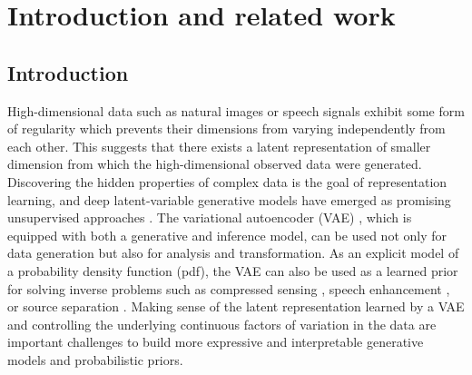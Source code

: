 \documentclass[review]{elsarticle}
\begin{document}

\section{Introduction and related work}

\subsection{Introduction}

High-dimensional data such as natural images or speech signals exhibit some form of regularity which prevents their dimensions from varying independently from each other. This suggests that there exists a latent representation of smaller dimension from which the high-dimensional observed data were generated. Discovering the hidden properties of complex data is the goal of representation learning, and deep latent-variable generative models have emerged as promising unsupervised approaches \citep{goodfellow2014generative, kingma2014auto, rezende2014stochastic, chen2016infogan, higgins2016beta, kim2018disentangling, chen2018isolating}. The variational autoencoder (VAE) \citep{kingma2014auto, rezende2014stochastic}, which is equipped with both a generative and inference model, can be used not only for data generation but also for analysis and transformation. As an explicit model of a probability density function (pdf), the VAE can also be used as a learned prior for solving inverse problems such as compressed sensing \citep{bora2017compressed}, speech enhancement \citep{bando2018statistical,leglaive_MLSP18}, or source separation \citep{kameoka2019supervised,jayaram2020source}. Making sense of the latent representation learned by a VAE and controlling the underlying continuous factors of variation in the data are important challenges to build more expressive and interpretable generative models and probabilistic priors.
\end{document}
